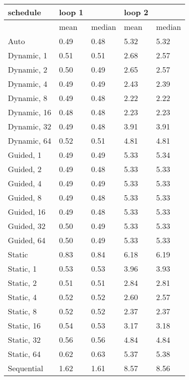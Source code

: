 \begin{tabu}{l|ll|ll}
schedule &loop 1 &&loop 2 \\
\hline
&mean &median &mean &median \\
\hline
Auto&0.49 &0.48 &5.32 &5.32\\
Dynamic, 1&0.51 &0.51 &2.68 &2.57\\
Dynamic, 2&0.50 &0.49 &2.65 &2.57\\
Dynamic, 4&0.49 &0.49 &2.43 &2.39\\
Dynamic, 8&0.49 &0.48 &2.22 &2.22\\
Dynamic, 16&0.48 &0.48 &2.23 &2.23\\
Dynamic, 32&0.49 &0.48 &3.91 &3.91\\
Dynamic, 64&0.52 &0.51 &4.81 &4.81\\
Guided, 1&0.49 &0.49 &5.33 &5.34\\
Guided, 2&0.49 &0.48 &5.33 &5.33\\
Guided, 4&0.49 &0.49 &5.33 &5.33\\
Guided, 8&0.49 &0.48 &5.33 &5.33\\
Guided, 16&0.49 &0.48 &5.33 &5.33\\
Guided, 32&0.50 &0.49 &5.33 &5.33\\
Guided, 64&0.50 &0.49 &5.33 &5.33\\
Static&0.83 &0.84 &6.18 &6.19\\
Static, 1&0.53 &0.53 &3.96 &3.93\\
Static, 2&0.51 &0.51 &2.84 &2.81\\
Static, 4&0.52 &0.52 &2.60 &2.57\\
Static, 8&0.52 &0.52 &2.37 &2.37\\
Static, 16&0.54 &0.53 &3.17 &3.18\\
Static, 32&0.56 &0.56 &4.84 &4.84\\
Static, 64&0.62 &0.63 &5.37 &5.38\\
Sequential&1.62 &1.61 &8.57 &8.56\\
\end{tabu}
